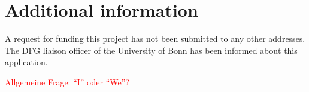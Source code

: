 \documentclass[a4paper,12pt]{article}
\begin{document}
\section{Additional information}

A request for funding this project has not been submitted to any other addresses. The DFG liaison officer of the University of Bonn has been informed about this application.



\vspace{10pt}

\noindent \textcolor{red}{Allgemeine Frage: ``I'' oder ``We''?}
\end{document}
